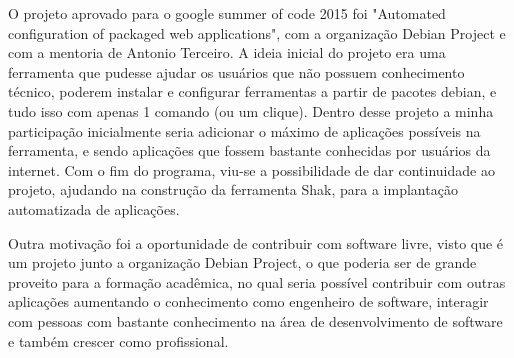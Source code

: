 O projeto aprovado para o google summer of code 2015 foi "Automated configuration
of packaged web applications", com a organização Debian Project e com a mentoria de
Antonio Terceiro. A ideia inicial do projeto era uma ferramenta que
pudesse ajudar os usuários que não possuem conhecimento técnico, poderem
instalar e configurar ferramentas a partir de pacotes debian, e tudo isso com
apenas 1 comando (ou um clique). Dentro desse projeto a minha participação
inicialmente seria adicionar o máximo de aplicações possíveis na ferramenta,
e sendo aplicações que fossem bastante conhecidas por usuários da internet. Com o
 fim do programa, viu-se a possibilidade de dar continuidade ao projeto, ajudando
na construção da ferramenta Shak, para a implantação automatizada de aplicações.

Outra motivação foi a oportunidade de contribuir com software livre, visto que é
um projeto junto a organização Debian Project, o que poderia ser de grande proveito
para a formação acadêmica, no qual seria possível contribuir com outras
aplicações aumentando o conhecimento como engenheiro de software, interagir com
pessoas com bastante conhecimento na área de desenvolvimento de software e também
crescer como profissional.
